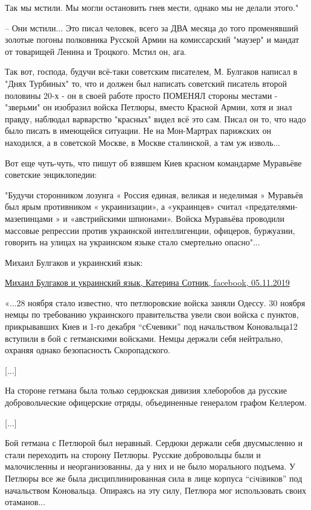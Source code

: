 \begin{itemize}
Так мы мстили. Мы могли остановить гнев мести, однако мы не делали этого."

– Они мстили... Это писал человек, всего за ДВА месяца до того променявший
золотые погоны полковника Русской Армии на комиссарский "маузер" и мандат от
товарищей Ленина и Троцкого. Мстил он, ага.

Так вот, господа, будучи всё-таки советским писателем, М. Булгаков написал в
"Днях Турбиных" то, что и должен был написать советский писатель второй
половины 20-х - он в своей работе просто ПОМЕНЯЛ стороны местами - "зверьми" он
изобразил войска Петлюры, вместо Красной Армии, хотя и знал правду, наблюдал
варварство "красных" видел всё это сам. Писал он то, что надо было писать в
имеющейся ситуации. Не на Мон-Мартрах парижских он находился, а в советской
Москве, в Москве сталинской, а там уж изволь...

Вот еще чуть-чуть, что пишут об взявшем Киев красном командарме Муравьёве
советские энциклопедии:

"Будучи сторонником лозунга « Россия единая, великая и неделимая » Муравьёв был
ярым противником « украинизации», а «украинцев» считал «предателями-
мазепинцами » и «австрийскими шпионами». Войска Муравьёва проводили массовые
репрессии против украинской интеллигенции, офицеров, буржуазии, говорить на
улицах на украинском языке стало смертельно опасно"...


Михаил Булгаков и украинский язык:

\href{https://www.facebook.com/groups/kiev.klab.group/posts/465339534329679}{%
Михаил Булгаков и украинский язык, Катерина Сотник, facebook, 05.11.2019%
}


«...28 ноября стало известно, что петлюровские войска заняли Одессу. 30 ноября
немцы по требованию украинского правительства увели свои войска с пунктов,
прикрывавших Киев и 1-го декабря \enquote{сЄчевики} под начальством Коновальца12
вступили в бой с гетманскими войсками. Немцы держали себя нейтрально, охраняя
однако безопасность Скоропадского.

[...]

На стороне гетмана была только сердюкская дивизия хлеборобов да русские
добровольческие офицерские отряды, объединенные генералом графом Келлером.

[...]

Бой гетмана с Петлюрой был неравный. Сердюки держали себя двусмысленно и стали
переходить на сторону Петлюры. Русские добровольцы были и малочисленны и
неорганизованны, да у них и не было морального подъема. У Петлюры все же была
дисциплинированная сила в лице корпуса \enquote{сiчiвиков} под начальством Коновальца.
Опираясь на эту силу, Петлюра мог использовать своих отаманов...


\end{itemize}
